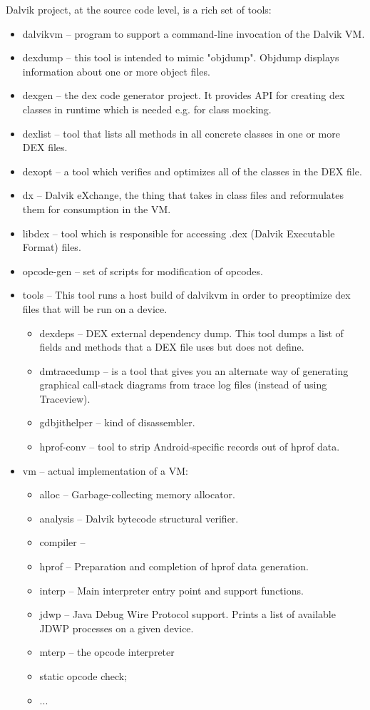\documentclass[11pt,a4paper]{article}
\begin{document}
Dalvik project, at the source code level, is a rich set of tools:
\begin{itemize}
  \item dalvikvm --  program to support a command-line invocation of the Dalvik VM.
  \item dexdump -- this tool is intended to mimic "objdump". Objdump displays information about one or more object files.
  \item dexgen -- the dex code generator project. It provides API for creating dex classes in runtime which is needed e.g. for class mocking.
  \item dexlist -- tool that lists all methods in all concrete classes in one or more DEX files.
  \item dexopt -- a tool which verifies and optimizes all of the classes in the DEX file.
  \item dx -- Dalvik eXchange, the thing that takes in class files and reformulates them for consumption in the VM.
  \item libdex -- tool which is responsible for accessing .dex (Dalvik Executable Format) files.
  \item opcode-gen -- set of scripts for modification of opcodes.
  \item tools -- This tool runs a host build of dalvikvm in order to preoptimize dex files that will be run on a device.
  \begin{itemize}
    \item dexdeps -- DEX external dependency dump. This tool dumps a list of fields and methods that a DEX file uses but does not define.
    \item dmtracedump -- is a tool that gives you an alternate way of generating graphical call-stack diagrams from trace log files (instead of using Traceview).
    \item gdbjithelper -- kind of disassembler.
    \item hprof-conv -- tool to strip Android-specific records out of hprof data.
  \end{itemize}
  \item vm -- actual implementation of a VM:
  \begin{itemize}
    \item alloc -- Garbage-collecting memory allocator.
    \item analysis -- Dalvik bytecode structural verifier. 
    \item compiler --
    \item hprof -- Preparation and completion of hprof data generation. 
    \item interp -- Main interpreter entry point and support functions.
    \item jdwp -- Java Debug Wire Protocol support. Prints a list of available JDWP processes on a given device. 
    \item mterp -- the opcode interpreter
    \item static opcode check;
    \item ...
  \end{itemize}
\end{itemize}
\end{document}
